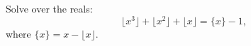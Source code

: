 Solve over the reals:
\[\lfloor x^3\rfloor+\lfloor x^2\rfloor+\lfloor x\rfloor=\{x\}-1,\]
where $\{x\}=x-\lfloor x\rfloor$.
